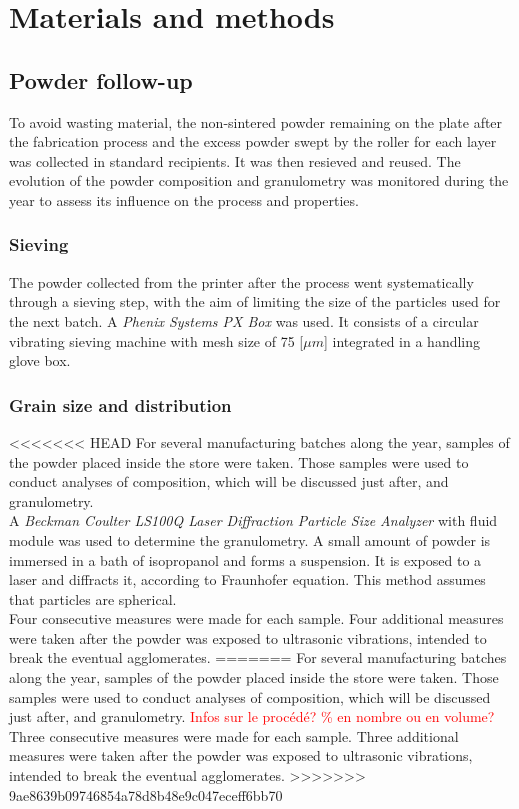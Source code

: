 \chapter{Materials and methods}
\label{Chap3}
\section{Powder follow-up}

To avoid wasting material, the non-sintered powder remaining on the plate after the fabrication process and the excess powder swept by the roller for each layer was collected in standard recipients. It was then resieved and reused. The evolution of the powder composition and granulometry was monitored during the year to assess its influence on the process and properties.

\subsection{Sieving}

The powder collected from the printer after the process went systematically through a sieving step, with the aim of limiting the size of the particles used for the next batch. A \textit{Phenix Systems PX Box} was used. It consists of a circular vibrating sieving machine with mesh size of 75 [$\mu m$] integrated in a handling glove box.

\subsection{Grain size and distribution}

<<<<<<< HEAD
For several manufacturing batches along the year, samples of the powder placed inside the store were taken. Those samples were used to conduct analyses of composition, which will be discussed just after, and granulometry.\\

A \textit{Beckman Coulter LS100Q Laser Diffraction Particle Size Analyzer} \cite{coulter} with fluid module was used to determine the granulometry. A small amount of powder is immersed in a bath of isopropanol and forms a suspension. It is exposed to a laser and diffracts it, according to Fraunhofer equation. This method assumes that particles are spherical.\\

Four consecutive measures were made for each sample. Four additional measures were taken after the powder was exposed to ultrasonic vibrations, intended to break the eventual agglomerates. 
=======
For several manufacturing batches along the year, samples of the powder placed inside the store were taken. Those samples were used to conduct analyses of composition, which will be discussed just after, and granulometry. \textcolor{red}{Infos sur le procédé? \% en nombre ou en volume?} Three consecutive measures were made for each sample. Three additional measures were taken after the powder was exposed to ultrasonic vibrations, intended to break the eventual agglomerates. 
>>>>>>> 9ae8639b09746854a78d8b48e9c047eceff6bb70

